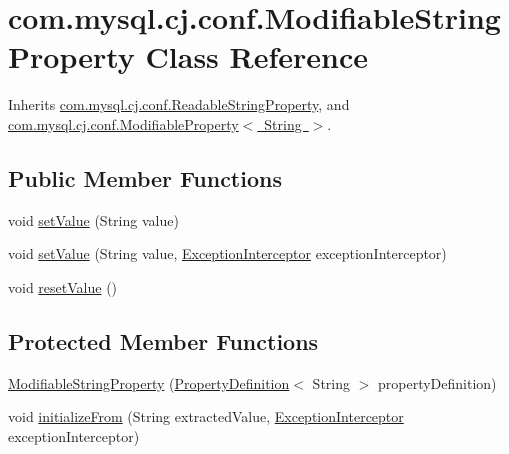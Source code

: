 \hypertarget{classcom_1_1mysql_1_1cj_1_1conf_1_1_modifiable_string_property}{}\section{com.\+mysql.\+cj.\+conf.\+Modifiable\+String\+Property Class Reference}
\label{classcom_1_1mysql_1_1cj_1_1conf_1_1_modifiable_string_property}


Inherits \mbox{\hyperlink{classcom_1_1mysql_1_1cj_1_1conf_1_1_readable_string_property}{com.\+mysql.\+cj.\+conf.\+Readable\+String\+Property}}, and \mbox{\hyperlink{interfacecom_1_1mysql_1_1cj_1_1conf_1_1_modifiable_property}{com.\+mysql.\+cj.\+conf.\+Modifiable\+Property$<$ String $>$}}.

\subsection*{Public Member Functions}
\begin{DoxyCompactItemize}
\item 
void \mbox{\hyperlink{classcom_1_1mysql_1_1cj_1_1conf_1_1_modifiable_string_property_a773bdb8f021ea228fb50b8157b8d7df4}{set\+Value}} (String value)
\item 
void \mbox{\hyperlink{classcom_1_1mysql_1_1cj_1_1conf_1_1_modifiable_string_property_a674e8599c141340fbc6e7e6acd7a2af2}{set\+Value}} (String value, \mbox{\hyperlink{interfacecom_1_1mysql_1_1cj_1_1exceptions_1_1_exception_interceptor}{Exception\+Interceptor}} exception\+Interceptor)
\item 
void \mbox{\hyperlink{classcom_1_1mysql_1_1cj_1_1conf_1_1_modifiable_string_property_a20025de14d8ef02a6b6d8427d6833609}{reset\+Value}} ()
\end{DoxyCompactItemize}
\subsection*{Protected Member Functions}
\begin{DoxyCompactItemize}
\item 
\mbox{\hyperlink{classcom_1_1mysql_1_1cj_1_1conf_1_1_modifiable_string_property_a71da56f8aed2b7045daf226d8b462316}{Modifiable\+String\+Property}} (\mbox{\hyperlink{interfacecom_1_1mysql_1_1cj_1_1conf_1_1_property_definition}{Property\+Definition}}$<$ String $>$ property\+Definition)
\item 
void \mbox{\hyperlink{classcom_1_1mysql_1_1cj_1_1conf_1_1_modifiable_string_property_a6afc0604f79ba60d05bc9891e1b6c5cb}{initialize\+From}} (String extracted\+Value, \mbox{\hyperlink{interfacecom_1_1mysql_1_1cj_1_1exceptions_1_1_exception_interceptor}{Exception\+Interceptor}} exception\+Interceptor)
\end{DoxyCompactItemize}


